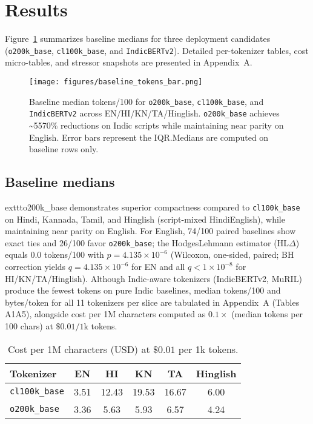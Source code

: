 \documentclass{article}
\begin{document}

\section{Results}
Figure~\ref{fig:baseline-tokens} summarizes baseline medians for three deployment candidates (\texttt{o200k\_base}, \texttt{cl100k\_base}, and \texttt{IndicBERTv2}). Detailed per-tokenizer tables, cost micro-tables, and stressor snapshots are presented in Appendix~A.\@

\begin{figure}[t]
\centering
\texttt{[image: figures/baseline\_tokens\_bar.png]}
\caption{Baseline median tokens/100 for \texttt{o200k\_base}, \texttt{cl100k\_base}, and \texttt{IndicBERTv2} across EN/HI/KN/TA/Hinglish. \texttt{o200k\_base} achieves \textasciitilde55\textendash{}70\% reductions on Indic scripts while maintaining near parity on English. Error bars represent the IQR.\@ Medians are computed on baseline rows only.}\label{fig:baseline-tokens}
\end{figure}

\subsection{Baseline medians}
	exttt{o200k\_base} demonstrates superior compactness compared to \texttt{cl100k\_base} on Hindi, Kannada, Tamil, and Hinglish (script-mixed Hindi\textendash{}English), while maintaining near parity on English. For English, 74/100 paired baselines show exact ties and 26/100 favor \texttt{o200k\_base}; the Hodges\textendash{}Lehmann estimator (HL$\Delta$) equals 0.0 tokens/100 with $p = 4.135\times10^{-6}$ (Wilcoxon, one-sided, paired; BH correction yields $q = 4.135\times10^{-6}$ for EN and all $q < 1\times10^{-8}$ for HI/KN/TA/Hinglish). Although Indic-aware tokenizers (IndicBERTv2, MuRIL) produce the fewest tokens on pure Indic baselines, median tokens/100 and bytes/token for all 11 tokenizers per slice are tabulated in Appendix~A (Tables A1\textendash{}A5), alongside cost per 1M characters computed as $0.1 \times$ (median tokens per 100 chars) at $\$0.01 / 1\text{k}$ tokens.

\begin{table}[t]
\centering
\caption{Cost per 1M characters (USD) at $\$0.01$ per 1k tokens.}
\begin{tabular}{lccccc}
\toprule
Tokenizer & EN & HI & KN & TA & Hinglish \\
\midrule
\texttt{cl100k\_base} & 3.51 & 12.43 & 19.53 & 16.67 & 6.00 \\
\texttt{o200k\_base} & 3.36 & 5.63 & 5.93 & 6.57 & 4.24 \\
\bottomrule
\end{tabular}
\end{table}
\end{document}
